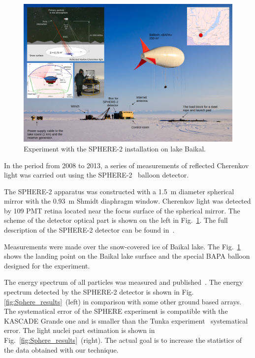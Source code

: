 \documentclass[a4paper,11pt]{article}
\begin{document}
\begin{figure}[t]
\centering
\includegraphics[width=1.0\textwidth]{Sphere2Baikal.png}
\caption{\label{fig:Sphere_Baikal} Experiment with the SPHERE-2 installation on lake Baikal.}
\end{figure}

In the period from 2008 to 2013, a series of measurements of reflected Cherenkov light was carried out using the SPHERE-2~\cite{Ant15a,Ant15c,Ant19} balloon detector. 

The SPHERE-2 apparatus was constructed with a 1.5~m diameter spherical mirror with the 0.93~m Shmidt diaphragm window. Cherenkov light was detected by 109 PMT retina located near the focus surface of the spherical mirror. The scheme of the detector optical part is shown on the left in Fig.~\ref{fig:Sphere_Baikal}. The full description of the SPHERE-2 detector can be found in~\cite{Ant15a,Ant20}.

Measurements were made over the snow-covered ice of Baikal lake. The Fig.~\ref{fig:Sphere_Baikal} shows the landing point on the Baikal lake surface and the special BAPA balloon designed for the experiment. 

The energy spectrum of all particles was measured and published~\cite{Ant15c}. The energy spectrum detected by the SPHERE-2 detector is shown in Fig.\ref{fig:Sphere_results}~(left) in comparison with some other ground based arrays. The systematical error of the SPHERE experiment is compatible with the KASCADE Grande one and is smaller than the Tunka experiment~\cite{Tunka2020} systematical error. The light nuclei part estimation is shown in Fig.~\ref{fig:Sphere_results}~(right). The actual goal is to increase the statistics of the data obtained with our technique.
\end{document}
